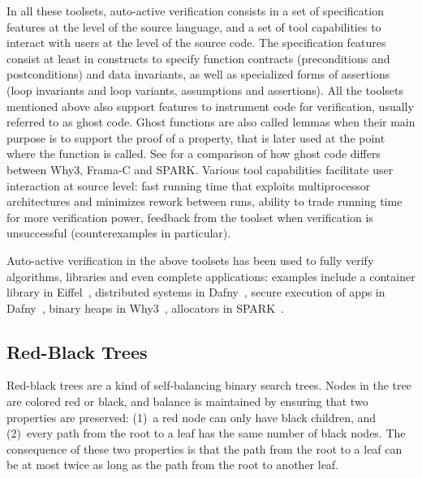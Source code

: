 \documentclass{llncs}
\newcommand{\spark}{SPARK\xspace}
\begin{document}
In all these toolsets, auto-active verification consists in a set of
specification features at the level of the source language, and a set of tool
capabilities to interact with users at the level of the source code. The
specification features consist at least in constructs to specify function
contracts (preconditions and postconditions) and data invariants, as well as
specialized forms of assertions (loop invariants and loop variants, assumptions
and assertions). All the toolsets mentioned above also support features to
instrument code for verification, usually referred to as ghost code. Ghost
functions are also called lemmas when their main purpose is to support the
proof of a property, that is later used at the point where the function is
called. See \cite{kosmatov:hal-01344110} for a comparison of how ghost code
differs between Why3, Frama-C and \spark. Various tool capabilities facilitate
user interaction at source level: fast running time that exploits
multiprocessor architectures and minimizes rework between runs, ability to
trade running time for more verification power, feedback from the toolset when
verification is unsuccessful (counterexamples in particular).

Auto-active verification in the above toolsets has been used to fully verify
algorithms, libraries and even complete applications: examples include a
container library in Eiffel~\cite{Polikarpova2015}, distributed systems in
Dafny~\cite{Hawblitzel2015IronFleet}, secure execution of apps in
Dafny~\cite{Hawblitzel2014Ironclad}, binary heaps in Why3~\cite{tafat11rr},
allocators in \spark~\cite{Dross2016}.

\subsection{Red-Black Trees}
\label{sec-prelim-rbt}

Red-black trees are a kind of self-balancing binary search trees. Nodes in the
tree are colored red or black, and balance is maintained by ensuring that two
properties are preserved: (1)~a red node can only have black children, and
(2)~every path from the root to a leaf has the same number of black nodes. The
consequence of these two properties is that the path from the root to a leaf
can be at most twice as long as the path from the root to another leaf.
\end{document}
